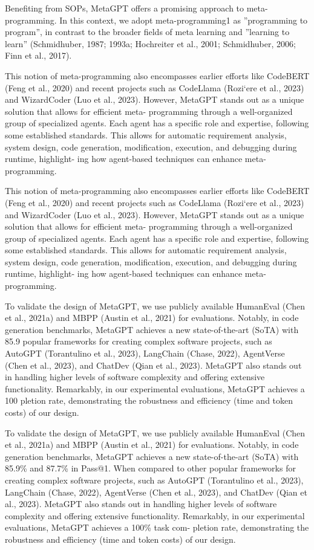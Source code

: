 \documentclass[12pt]{article}
\begin{document}
Benefiting from SOPs, MetaGPT offers a promising approach to meta-programming. In this context,
we adopt meta-programming1 as ”programming to program”, in contrast to the broader fields of meta
learning and ”learning to learn” (Schmidhuber, 1987; 1993a; Hochreiter et al., 2001; Schmidhuber,
2006; Finn et al., 2017).


This notion of meta-programming also encompasses earlier efforts like CodeBERT (Feng et al.,
2020) and recent projects such as CodeLlama (Rozi`ere et al., 2023) and WizardCoder (Luo
et al., 2023). However, MetaGPT stands out as a unique solution that allows for efficient meta-
programming through a well-organized group of specialized agents. Each agent has a specific role
and expertise, following some established standards. This allows for automatic requirement analysis,
system design, code generation, modification, execution, and debugging during runtime, highlight-
ing how agent-based techniques can enhance meta-programming.


This notion of meta-programming also encompasses earlier efforts like CodeBERT (Feng et al.,
2020) and recent projects such as CodeLlama (Rozi`ere et al., 2023) and WizardCoder (Luo
et al., 2023). However, MetaGPT stands out as a unique solution that allows for efficient meta-
programming through a well-organized group of specialized agents. Each agent has a specific role
and expertise, following some established standards. This allows for automatic requirement analysis,
system design, code generation, modification, execution, and debugging during runtime, highlight-
ing how agent-based techniques can enhance meta-programming.


To validate the design of MetaGPT, we use publicly available HumanEval (Chen et al., 2021a) and
MBPP (Austin et al., 2021) for evaluations. Notably, in code generation benchmarks, MetaGPT
achieves a new state-of-the-art (SoTA) with 85.9%
popular frameworks for creating complex software projects, such as AutoGPT (Torantulino et al.,
2023), LangChain (Chase, 2022), AgentVerse (Chen et al., 2023), and ChatDev (Qian et al., 2023).
MetaGPT also stands out in handling higher levels of software complexity and offering extensive
functionality. Remarkably, in our experimental evaluations, MetaGPT achieves a 100%
pletion rate, demonstrating the robustness and efficiency (time and token costs) of our design.


To validate the design of MetaGPT, we use publicly available HumanEval (Chen et al., 2021a) and
MBPP (Austin et al., 2021) for evaluations. Notably, in code generation benchmarks, MetaGPT
achieves a new state-of-the-art (SoTA) with 85.9\% and 87.7\% in Pass@1. When compared to other
popular frameworks for creating complex software projects, such as AutoGPT (Torantulino et al.,
2023), LangChain (Chase, 2022), AgentVerse (Chen et al., 2023), and ChatDev (Qian et al., 2023).
MetaGPT also stands out in handling higher levels of software complexity and offering extensive
functionality. Remarkably, in our experimental evaluations, MetaGPT achieves a 100\% task com-
pletion rate, demonstrating the robustness and efficiency (time and token costs) of our design.
\end{document}
